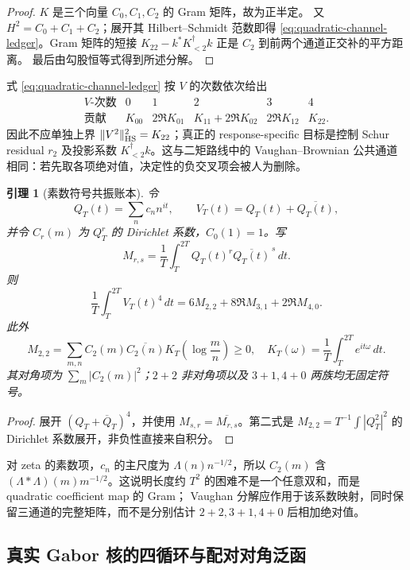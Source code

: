 \documentclass[UTF8,11pt,a4paper]{ctexart}
\newtheorem{lemma}[theorem]{引理}
\theoremstyle{definition}
\theoremstyle{remark}
\begin{document}
\begin{proof}
$K$ 是三个向量 $C_0,C_1,C_2$ 的 Gram 矩阵，故为正半定。
又 $H^2=C_0+C_1+C_2$；展开其 Hilbert--Schmidt 范数即得
\eqref{eq:quadratic-channel-ledger}。Gram 矩阵的短接
$K_{22}-k^*K_{<2}^{\dagger}k$ 正是 $C_2$ 到前两个通道正交补的平方距离。
最后由勾股恒等式得到所述分解。
\end{proof}

式 \eqref{eq:quadratic-channel-ledger} 按 $V$ 的次数依次给出
\[
\begin{array}{c|ccccc}
\text{$V$-次数}&0&1&2&3&4\\ \hline
\text{贡献}&K_{00}&2\Re K_{01}&K_{11}+2\Re K_{02}
&2\Re K_{12}&K_{22}.
\end{array}
\]
因此不应单独上界 $\|V^2\|_{\rm HS}^2=K_{22}$；真正的 response-specific
目标是控制 Schur residual $r_2$ 及投影系数
$K_{<2}^{\dagger}k$。这与二矩路线中的 Vaughan--Brownian
公共通道相同：若先取各项绝对值，决定性的负交叉项会被人为删除。

\begin{lemma}[素数符号共振账本]\label{lem:prime-sign-ledger}
令
\[
 Q_T(t)=\sum_n c_n n^{it},\qquad V_T(t)=Q_T(t)+\overline{Q_T(t)},
\]
并令 $C_r(m)$ 为 $Q_T^r$ 的 Dirichlet 系数，$C_0(1)=1$。写
\[
 M_{r,s}=\frac1T\int_T^{2T}Q_T(t)^r\overline{Q_T(t)}^{\,s}\,dt.
\]
则
\[
 \frac1T\int_T^{2T}V_T(t)^4\,dt
 =6M_{2,2}+8\Re M_{3,1}+2\Re M_{4,0}.
\]
此外
\[
 M_{2,2}
 =\sum_{m,n}C_2(m)\overline{C_2(n)}
 K_T\!\left(\log\frac mn\right)\ge0,
\quad
 K_T(\omega)=\frac1T\int_T^{2T}e^{it\omega}\,dt.
\]
其对角项为 $\sum_m|C_2(m)|^2$；$2+2$ 非对角项以及
$3+1,4+0$ 两族均无固定符号。
\end{lemma}

\begin{proof}
展开 $(Q_T+\overline Q_T)^4$，并使用
$M_{s,r}=\overline{M_{r,s}}$。第二式是
$M_{2,2}=T^{-1}\int|Q_T^2|^2$ 的 Dirichlet 系数展开，非负性直接来自积分。
\end{proof}

对 zeta 的素数项，$c_n$ 的主尺度为 $\Lambda(n)n^{-1/2}$，所以
$C_2(m)$ 含 $(\Lambda*\Lambda)(m)m^{-1/2}$。这说明长度约 $T^2$
的困难不是一个任意双和，而是 quadratic coefficient map 的 Gram；
Vaughan 分解应作用于该系数映射，同时保留三通道的完整矩阵，而不是分别估计
$2+2,3+1,4+0$ 后相加绝对值。

\subsection{真实 Gabor 核的四循环与配对对角泛函}
\end{document}
